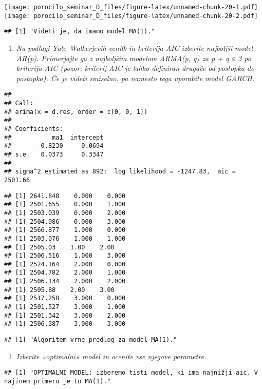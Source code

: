 \documentclass[
]{article}
\providecommand{\tightlist}{%
  \setlength{\itemsep}{0pt}\setlength{\parskip}{0pt}}
\begin{document}
\texttt{[image: porocilo\_seminar\_D\_files/figure-latex/unnamed-chunk-20-1.pdf]}
\texttt{[image: porocilo\_seminar\_D\_files/figure-latex/unnamed-chunk-20-2.pdf]}

\begin{verbatim}
## [1] "Videti je, da imamo model MA(1)."
\end{verbatim}

\begin{enumerate}
\def\labelenumi{\arabic{enumi}.}
\setcounter{enumi}{4}
\tightlist
\item
  \emph{Na podlagi Yule--Walkerjevih cenilk in kriterija AIC izberite
  najboljši model AR(p). Primerjajte ga z najboljšim modelom ARMA(p, q)
  za p + q ≤ 3 po kriteriju AIC (pozor: kriterij AIC je lahko definiran
  drugače od postopka do postopka). Če je videti smiselno, pa namesto
  tega uporabite model GARCH.}
\end{enumerate}

\begin{verbatim}
## 
## Call:
## arima(x = d.res, order = c(0, 0, 1))
## 
## Coefficients:
##           ma1  intercept
##       -0.8230     0.0694
## s.e.   0.0373     0.3347
## 
## sigma^2 estimated as 892:  log likelihood = -1247.83,  aic = 2501.66
\end{verbatim}

\begin{verbatim}
## [1] 2641.848    0.000    0.000
## [1] 2501.655    0.000    1.000
## [1] 2503.039    0.000    2.000
## [1] 2504.986    0.000    3.000
## [1] 2566.877    1.000    0.000
## [1] 2503.076    1.000    1.000
## [1] 2505.03    1.00    2.00
## [1] 2506.516    1.000    3.000
## [1] 2524.164    2.000    0.000
## [1] 2504.782    2.000    1.000
## [1] 2506.134    2.000    2.000
## [1] 2505.88    2.00    3.00
## [1] 2517.258    3.000    0.000
## [1] 2501.527    3.000    1.000
## [1] 2501.342    3.000    2.000
## [1] 2506.387    3.000    3.000
\end{verbatim}

\begin{verbatim}
## [1] "Algoritem vrne predlog za model MA(1)."
\end{verbatim}

\begin{enumerate}
\def\labelenumi{\arabic{enumi}.}
\setcounter{enumi}{5}
\tightlist
\item
  \emph{Izberite »optimalni« model in ocenite vse njegove parametre.}
\end{enumerate}

\begin{verbatim}
## [1] "OPTIMALNI MODEL: izberemo tisti model, ki ima najnižji aic. V najinem primeru je to MA(1)."
\end{verbatim}
\end{document}
